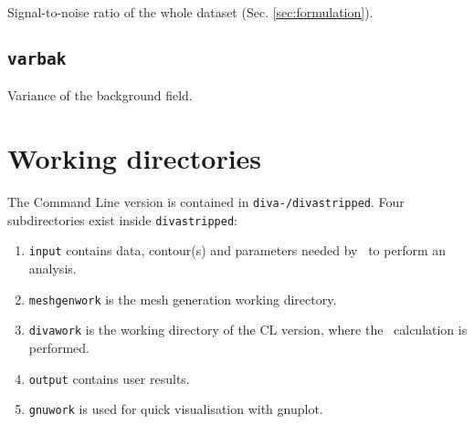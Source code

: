 Signal-to-noise ratio of the whole dataset (Sec. \ref{sec:formulation}).


\subsection{\texttt{varbak}}

Variance of the background field.


%

\section{Working directories}

The Command Line version is contained in \texttt{diva-\divaversion/divastripped}. Four subdirectories exist inside \texttt{divastripped}:

\begin{enumerate}
\item \texttt{input} contains data, contour(s) and parameters needed by \diva\, to perform an analysis.

\item \texttt{meshgenwork} is the mesh generation working directory.

\item \texttt{divawork} is the working directory of the CL version, where the \diva\, calculation is performed. 

\item \texttt{output} contains user results.

\item \texttt{gnuwork} is used for quick visualisation with gnuplot.

\end{enumerate}
